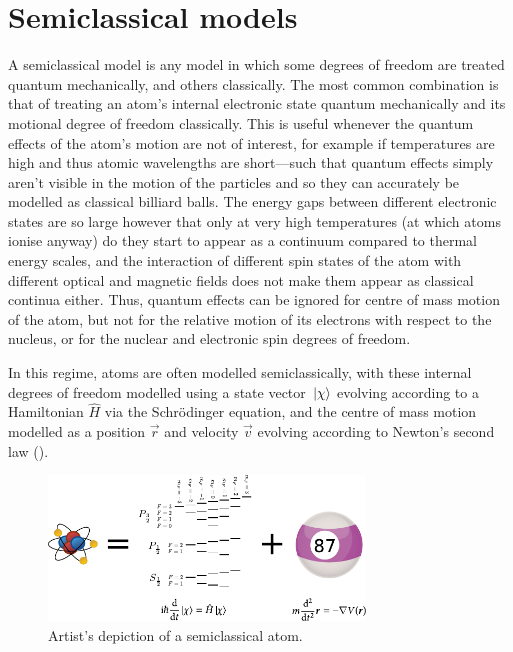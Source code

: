 \section{Semiclassical models}\label{sec:semiclassical_methods}

A semiclassical model is any model in which some degrees of freedom are treated quantum mechanically, and others classically. The most common combination is that of treating an atom's internal electronic state quantum mechanically and its motional degree of freedom classically. This is useful whenever the quantum effects of the atom's motion are not of interest, for example if temperatures are high and thus atomic wavelengths are short---such that quantum effects simply aren't visible in the motion of the particles and so they can accurately be modelled as classical billiard balls. The energy gaps between different electronic states are so large however that only at very high temperatures (at which atoms ionise anyway) do they start to appear as a continuum compared to thermal energy scales, and the interaction of different spin states of the atom with different optical and magnetic fields does not make them appear as classical continua either. Thus, quantum effects can be ignored for centre of mass motion of the atom, but not for the relative motion of its electrons with respect to the nucleus, or for the nuclear and electronic spin degrees of freedom.

In this regime, atoms are often modelled semiclassically, with these internal degrees of freedom modelled using a state vector $\ket\chi$ evolving according to a Hamiltonian $\hat H$ via the Schr\"odinger equation, and the centre of mass motion modelled as a position $\vec r$ and velocity $\vec v$ evolving according to Newton's second law ().

\begin{figure}[t]
    \centerfloat
    \includegraphics[width=0.75\textwidth]{figures/hidden_variables/semiclassical.pdf}
    \caption{Artist's depiction of a semiclassical atom.}
    \label{fig:semiclassical}
\end{figure}

